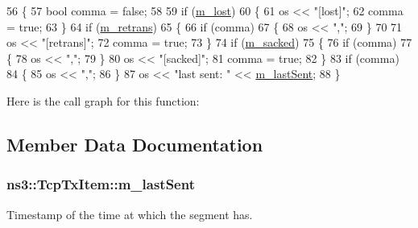 \begin{DoxyCode}
56 \{
57   \textcolor{keywordtype}{bool} comma = \textcolor{keyword}{false};
58 
59   \textcolor{keywordflow}{if} (\hyperlink{classns3_1_1TcpTxItem_ad7e543719e0aacde056350f7376dca74}{m\_lost})
60     \{
61       os << \textcolor{stringliteral}{"[lost]"};
62       comma = \textcolor{keyword}{true};
63     \}
64   \textcolor{keywordflow}{if} (\hyperlink{classns3_1_1TcpTxItem_a15fa2c24263563070aec47c52ad70050}{m\_retrans})
65     \{
66       \textcolor{keywordflow}{if} (comma)
67         \{
68           os << \textcolor{stringliteral}{","};
69         \}
70 
71       os << \textcolor{stringliteral}{"[retrans]"};
72       comma = \textcolor{keyword}{true};
73     \}
74   \textcolor{keywordflow}{if} (\hyperlink{classns3_1_1TcpTxItem_a07eed696a5ebcd8941ffbf515147bb14}{m\_sacked})
75     \{
76       \textcolor{keywordflow}{if} (comma)
77         \{
78           os << \textcolor{stringliteral}{","};
79         \}
80       os << \textcolor{stringliteral}{"[sacked]"};
81       comma = \textcolor{keyword}{true};
82     \}
83   \textcolor{keywordflow}{if} (comma)
84     \{
85       os << \textcolor{stringliteral}{","};
86     \}
87   os << \textcolor{stringliteral}{"last sent: "} << \hyperlink{classns3_1_1TcpTxItem_a750577092d6b0aa4f818652586f4351f}{m\_lastSent};
88 \}
\end{DoxyCode}


Here is the call graph for this function\+:




\subsection{Member Data Documentation}
\subsubsection[{\texorpdfstring{m\+\_\+last\+Sent}{m_lastSent}}]{ ns3\+::\+Tcp\+Tx\+Item\+::m\+\_\+last\+Sent}\hypertarget{classns3_1_1TcpTxItem_a750577092d6b0aa4f818652586f4351f}{}\label{classns3_1_1TcpTxItem_a750577092d6b0aa4f818652586f4351f}


Timestamp of the time at which the segment has. 

